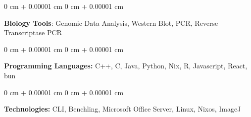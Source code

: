 \documentclass[10pt, article]{article}
\newenvironment{onecolentry}{
    \begin{adjustwidth}{
        0 cm + 0.00001 cm
    }{
        0 cm + 0.00001 cm
    }
}{
    \end{adjustwidth}
} %
\begin{document}
        \begin{onecolentry}
            {\textbf{Biology Tools}:} Genomic Data Analysis, Western Blot, PCR, Reverse Transcriptase PCR
        \end{onecolentry}
        \vspace{0.2 cm}
        \begin{onecolentry}
            \textbf{Programming Languages:} C++, C, Java, Python, Nix, R, Javascript, React, bun
        \end{onecolentry}

        \vspace{0.2 cm}

        \begin{onecolentry}
            \textbf{Technologies:} CLI, Benchling, Microsoft Office Server, Linux, Nixos, ImageJ
        \end{onecolentry}
     
\end{document}
